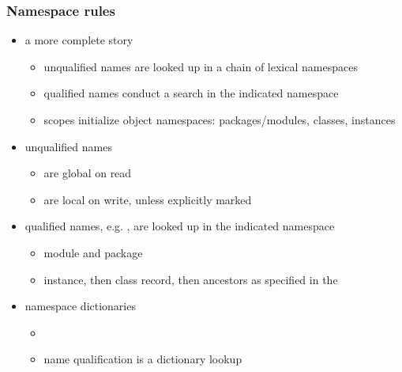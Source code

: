 \begin{frame}[fragile]
%
  \frametitle{Namespace rules}
%
  \begin{itemize}
%
  \item a more complete story
    \begin{itemize}
    \item unqualified names are looked up in a chain of lexical namespaces
    \item qualified names conduct a search in the indicated namespace
    \item scopes initialize object namespaces: packages/modules, classes, instances
    \end{itemize}
%
  \item unqualified names
    \begin{itemize}
    \item are global on read
    \item are local on write, unless explicitly marked 
    \end{itemize}
%
  \item qualified names, e.g. , are looked up in the indicated namespace
    \begin{itemize}
    \item module and package
    \item instance, then class record, then ancestors as specified in the 
    \end{itemize}
%
  \item namespace dictionaries
    \begin{itemize}
    \item {}
    \item name qualification is a dictionary lookup
    \end{itemize}
%
  \end{itemize}
%
\end{frame}

